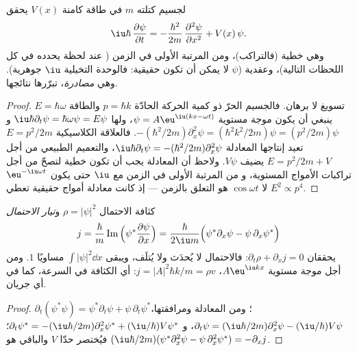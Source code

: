 \begin{theorem}\label{thm:b2:schrodinger-wave-functions:equation}
لجسيم كتلته $m$ في طاقة كامنة $V(x)$  يحقق
\[
\iu\hbar\,\frac{\partial\psi}{\partial t} = -\frac{\hbar^2}{2m}\,\frac{\partial^2\psi}{\partial x^2} + V(x)\,\psi .
\]
وهي خطية (فالتراكب)، ومن المرتبة الأولى في الزمن (
عند لحظة يحدده في كل اللحظات التالية)، وعقدية ($\psi$
لا يمكن أن تكون حقيقية: فالوحدة التخيلية $\iu$ جوهرية). وهي \emph{مصادرة}،
تبرّرها نتائجها.
\end{theorem}

\begin{proof}
تسويغ لا برهان. فالجسيم الحرّ ذو كمية الحركة الحادّة
$p = \hbar k$ والطاقة $E = \hbar\omega$ ينبغي أن يكون موجة مستوية $\psi =
A\eu^{\iu(kx - \omega t)}$، ولها $\iu\hbar\partial_t\psi = \hbar\omega\psi =
E\psi$ و $-(\hbar^2/2m)\partial_x^2\psi = (\hbar^2k^2/2m)\psi = (p^2/2m)\psi$.
فالعلاقة الكلاسيكية $E = p^2/2m$ تعيد إنتاجها المعادلة
$\iu\hbar\partial_t\psi = -(\hbar^2/2m)\partial_x^2\psi$، والتعميم
الطبيعي من أجل $E = p^2/2m + V$ يضيف $V\psi$. ولاحظ أن
المعادلة يجب أن تكون خطية لتصحّ من أجل تراكبات الأمواج المستوية، و
من المرتبة الأولى في الزمن مع $\iu$ حتى يكون $\eu^{-\iu\omega t}$ لا
$\cos\omega t$ هو التعلق بالزمن --- إذ كانت معادلة أمواج حقيقية
تعطي $E^2 \propto p^4$.
\end{proof}

\begin{proposition}\label{prop:b2:schrodinger-wave-functions:current}
كثافة الاحتمال $\rho = |\psi|^2$ و\emph{تيار
الاحتمال}
\[
j = \frac{\hbar}{m}\operatorname{Im}\Big(\psi^*\frac{\partial\psi}{\partial x}\Big)
= \frac{\hbar}{2\iu m}\Big(\psi^*\partial_x\psi - \psi\,\partial_x\psi^*\Big)
\]
يحققان $\partial_t\rho + \partial_xj = 0$: فالاحتمال لا يُحدَث ولا
يُتلَف، ويبقى $\int|\psi|^2\dd x$ مساويًا $1$. ومن أجل موجة مستوية
$A\eu^{\iu kx}$، $j = |A|^2\hbar k/m = \rho v$: أي الكثافة في السرعة، كما في
أي جريان.
\end{proposition}

\begin{proof}
$\partial_t(\psi^*\psi) = \psi^*\partial_t\psi + \psi\,\partial_t\psi^*$؛ ومن
المعادلة ومرافقتها، $\partial_t\psi = (\iu\hbar/2m)\partial_x^2\psi -
(\iu/\hbar)V\psi$، و $\partial_t\psi^* = -(\iu\hbar/2m)\partial_x^2\psi^* +
(\iu/\hbar)V\psi^*$؛ فيُختصر حدّا $V$ والباقي هو $(\iu\hbar/2m)(\psi^*
\partial_x^2\psi - \psi\,\partial_x^2\psi^*) = -\partial_xj$.
\end{proof}

